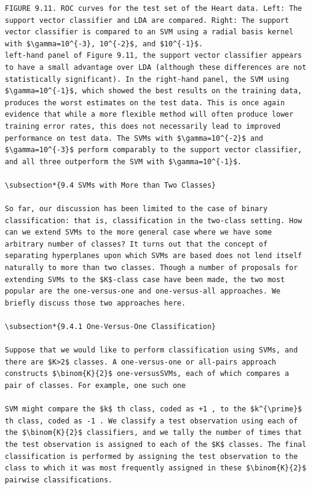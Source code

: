 \documentclass[10pt]{article}
\begin{document}
\begin{verbatim}
FIGURE 9.11. ROC curves for the test set of the Heart data. Left: The support vector classifier and LDA are compared. Right: The support vector classifier is compared to an SVM using a radial basis kernel with $\gamma=10^{-3}, 10^{-2}$, and $10^{-1}$.
left-hand panel of Figure 9.11, the support vector classifier appears to have a small advantage over LDA (although these differences are not statistically significant). In the right-hand panel, the SVM using $\gamma=10^{-1}$, which showed the best results on the training data, produces the worst estimates on the test data. This is once again evidence that while a more flexible method will often produce lower training error rates, this does not necessarily lead to improved performance on test data. The SVMs with $\gamma=10^{-2}$ and $\gamma=10^{-3}$ perform comparably to the support vector classifier, and all three outperform the SVM with $\gamma=10^{-1}$.

\subsection*{9.4 SVMs with More than Two Classes}

So far, our discussion has been limited to the case of binary classification: that is, classification in the two-class setting. How can we extend SVMs to the more general case where we have some arbitrary number of classes? It turns out that the concept of separating hyperplanes upon which SVMs are based does not lend itself naturally to more than two classes. Though a number of proposals for extending SVMs to the $K$-class case have been made, the two most popular are the one-versus-one and one-versus-all approaches. We briefly discuss those two approaches here.

\subsection*{9.4.1 One-Versus-One Classification}

Suppose that we would like to perform classification using SVMs, and there are $K>2$ classes. A one-versus-one or all-pairs approach constructs $\binom{K}{2}$ one-versusSVMs, each of which compares a pair of classes. For example, one such one

SVM might compare the $k$ th class, coded as +1 , to the $k^{\prime}$ th class, coded as -1 . We classify a test observation using each of the $\binom{K}{2}$ classifiers, and we tally the number of times that the test observation is assigned to each of the $K$ classes. The final classification is performed by assigning the test observation to the class to which it was most frequently assigned in these $\binom{K}{2}$ pairwise classifications.


\end{verbatim}
\end{document}
